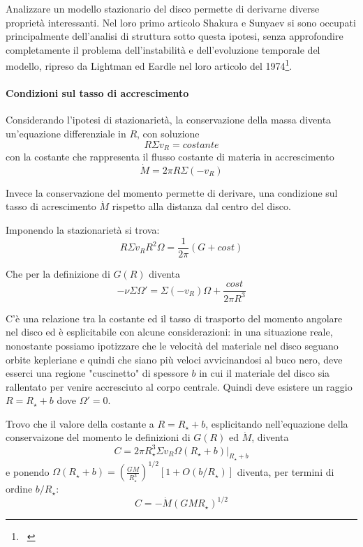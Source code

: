\documentclass[a4paperbi]{article}
\begin{document}
	Analizzare un modello stazionario del disco permette di derivarne diverse proprietà interessanti. Nel loro primo articolo Shakura e Sunyaev si sono occupati principalmente dell'analisi di struttura sotto questa ipotesi, senza approfondire completamente il problema dell'instabilità e dell'evoluzione temporale del modello, ripreso da Lightman ed Eardle nel loro articolo del 1974\footnote{~\cite{LightmanEardley1974}}.
	
	\paragraph{Condizioni sul tasso di accrescimento}
	Considerando l'ipotesi di stazionarietà, la conservazione della massa diventa un'equazione differenziale in $R$, con soluzione
	\begin{equation}
		R\Sigma v_R=costante
	\end{equation}
	con la costante che rappresenta il flusso costante di materia in accrescimento
	\begin{equation}
		\dot{M}=2\pi R\Sigma(-v_R)
	\end{equation}
	
	Invece la conservazione del momento permette di derivare, una condizione sul tasso di acrescimento $\dot{M}$ rispetto alla distanza dal centro del disco.
	
	Imponendo la stazionarietà si trova:
	\begin{equation}
		R\Sigma v_RR^2\Omega=\frac{1}{2\pi}(G+cost)
	\end{equation}
	
	Che per la definizione di $G(R)$ diventa
	\begin{equation}
		-\nu\Sigma\Omega'=\Sigma(-v_R)\Omega+\frac{cost}{2\pi R^3}
	\end{equation}
	
	C'è una relazione tra la costante ed il tasso di trasporto del momento angolare nel disco ed è esplicitabile con alcune considerazioni: in una situazione reale, nonostante possiamo ipotizzare che le velocità del materiale nel disco seguano orbite kepleriane e quindi che siano più veloci avvicinandosi al buco nero, deve esserci una regione "cuscinetto" di spessore $b$ in cui il materiale del disco sia rallentato per venire accresciuto al corpo centrale. Quindi deve esistere un raggio $R=R_{\star}+b$ dove $\Omega'=0$.

	Trovo che il valore della costante a $R=R_{\star}+b$, esplicitando nell'equazione della conservaizone del momento le definizioni di $G(R)$ ed $\dot{M}$, diventa
	\begin{equation*}
		C=2\pi R_{\star}^3\Sigma v_R\Omega(R_{\star}+b)\vert_{R_{\star}+b}
	\end{equation*}
	e ponendo $\Omega(R_{\star}+b)=\left(\frac{GM}{R_{\star}^3}\right)^{1/2}[1+O(b/R_{\star})]$ diventa, per termini di ordine $b/R_{\star}$:
	\begin{equation}
		C=-\dot{M}(GMR_{\star})^{1/2}
	\end{equation}	
\end{document}
